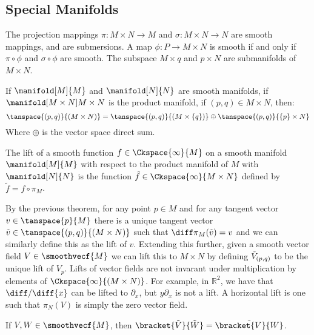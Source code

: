 \documentclass{article}                                                        %
\begin{document}
        \subsection{Special Manifolds}
            The projection mappings $\pi:M\times{N}\rightarrow{M}$ and
            $\sigma:M\times{N}\rightarrow{N}$ are smooth mappings, and are
            submersions. A map $\phi:{P}\rightarrow{M}\times{N}$ is smooth if
            and only if $\pi\circ\phi$ and $\sigma\circ\phi$ are smooth. The
            subspace $M\times{q}$ and $p\times{N}$ are submanifolds of
            $M\times{N}$.
            \begin{theorem}
                If $\manifold[M]{M}$ and $\manifold[N]{N}$ are smooth manifolds,
                if $\manifold[M\times{N}]{M\times{N}}$ is the product manifold,
                if $(p,q)\in{M}\times{N}$, then:
                \begin{equation}
                    \tanspace{(p,q)}{(M\times{N})}
                    =\tanspace{(p,q)}{(M\times\{q\})}\oplus
                    \tanspace{(p,q)}{\{p\}\times{N}}
                \end{equation}
                Where $\oplus$ is the vector space direct sum.
            \end{theorem}
            \begin{definition}
                The lift of a smooth function $f\in\Ckspace{\infty}{M}$ on a
                smooth manifold $\manifold[M]{M}$ with respect to the product
                manifold of $M$ with $\manifold[N]{N}$ is the function
                $\tilde{f}\in\Ckspace{\infty}{M\times{N}}$ defined by
                $\tilde{f}=f\circ\pi_{M}$.
            \end{definition}
            By the previous theorem, for any point $p\in{M}$ and for any tangent
            vector $v\in\tanspace{p}{M}$ there is a unique tangent vector
            $\tilde{v}\in\tanspace{(p,q)}{(M\times{N})}$ such that
            $\diff\pi_{M}(\tilde{v})=v$ and we can similarly define this as the
            lift of $v$. Extending this further, given a smooth vector field
            $V\in\smoothvecf{M}$ we can lift this to $M\times{N}$ by defining
            $\Tilde{V}_{(p,q)}$ to be the unique lift of $V_{p}$. Lifts of
            vector fields are not invarant under multiplication by elements of
            $\Ckspace{\infty}{(M\times{N})}$. For example, in $\mathbb{R}^{2}$,
            we have that $\diff/\diff{x}$ can be lifted to $\partial_{x}$, but
            $y\partial_{x}$ is not a lift. A horizontal lift is one such that
            $\pi_{N}(V)$ is simply the zero vector field.
            \begin{theorem}
                If $V,W\in\smoothvecf{M}$, then
                $\bracket{\tilde{V}}{\tilde{W}}=\tilde{\bracket{V}{W}}$.
            \end{theorem}
\end{document}
